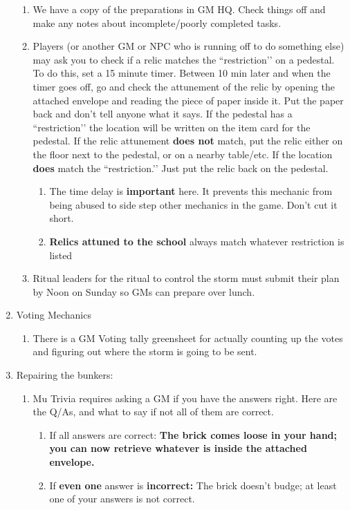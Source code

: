 \documentclass[green]{GL2020}
\begin{document}
\begin{enumerate}
	\begin{enumerate}
		\item We have a copy of the preparations in GM HQ. Check things off and make any notes about incomplete/poorly completed tasks.
		\item Players (or another GM or NPC who is running off to do something else) may ask you to check if a relic matches the ``restriction’’ on a pedestal. To do this, set a 15 minute timer. Between 10 min later and when the timer goes off, go and check the attunement of the relic by opening the attached envelope and reading the piece of paper inside it. Put the paper back and don’t tell anyone what it says. If the pedestal has a ``restriction’’ the location will be written on the item card for the pedestal. If the relic attunement \textbf{does not} match, put the relic either on the floor next to the pedestal, or on a nearby table/etc. If the location \textbf{does} match the ``restriction.’’ Just put the relic back on the pedestal.
\begin{enumerate}
\item The time delay is \textbf{important} here. It prevents this mechanic from being abused to side step other mechanics in the game. Don’t cut it short.
\item \textbf{Relics attuned to the school} always match whatever restriction is listed
		\end{enumerate}
		\item Ritual leaders for the ritual to control the storm must submit their plan by Noon on Sunday so GMs can prepare over lunch.
	\end{enumerate}
	\item Voting Mechanics
	\begin{enumerate}
		\item There is a GM Voting tally greensheet for actually counting up the votes and figuring out where the storm is going to be sent.
	\end{enumerate}
	\item Repairing the bunkers:
	\begin{enumerate}
	\item Mu Trivia requires asking a GM if you have the answers right. Here are the Q/As, and what to say if not all of them are correct.
		\begin{enumerate}
			\item If all answers are correct: \textbf{The brick comes loose in your hand; you can now retrieve whatever is inside the attached envelope.}
		\item If \textbf{even one} answer is \textbf{incorrect:} The brick doesn't budge; at least one of your answers is not correct.

\end{enumerate}
\end{enumerate}
\end{enumerate}
\end{document}
